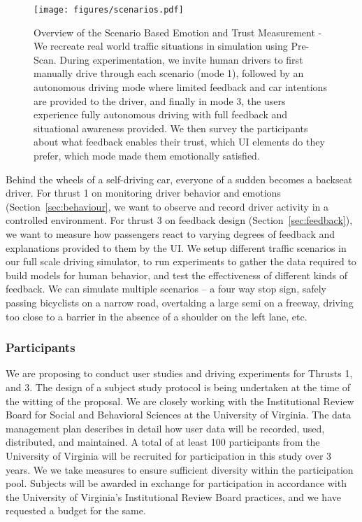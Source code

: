 \begin{figure}
    \centering
    \texttt{[image: figures/scenarios.pdf]}
    \caption{Overview of the Scenario Based Emotion and Trust Measurement - We recreate real world traffic situations in simulation using Pre-Scan. During experimentation, we invite human drivers to first manually drive through each scenario (mode 1), followed by an autonomous driving mode where limited feedback and car intentions are provided to the driver, and finally in mode 3, the users experience fully autonomous driving with full feedback and situational awareness provided. We then survey the participants about what feedback enables their trust, which UI elements do they prefer, which mode made them emotionally satisfied.  }
    \label{fig:scenario}
\end{figure}

Behind the wheels of a self-driving car, everyone of a sudden becomes a backseat driver. For thrust 1 on monitoring driver behavior and emotions (Section~\ref{sec:behaviour}, we want to observe and record driver activity in a controlled environment. 
For thrust 3 on feedback design (Section~\ref{sec:feedback}), we want to measure how passengers react to varying degrees of feedback and explanations provided to them by the UI. We setup different traffic scenarios in our full scale driving simulator, to run experiments to gather the data required to build models for human behavior, and test the effectiveness of different kinds of feedback. 
We can simulate multiple scenarios – a four way stop sign, safely passing bicyclists on a narrow road, overtaking a large semi on a freeway, driving too close to a barrier in the absence of a shoulder on the left lane, etc. 

\subsubsection{Participants}
We are proposing to conduct user studies and driving experiments for Thrusts 1, and 3.
The design of a subject study protocol is being undertaken at the time of the witting of the proposal. We are closely working with the Institutional Review Board for Social and Behavioral Sciences at the University of Virginia. The data management plan describes in detail how user data will be recorded, used, distributed, and maintained. A total of at least 100 participants from the University of Virginia will be recruited for participation in this study over 3 years. We we take measures to ensure sufficient diversity within the participation pool. Subjects will be awarded in exchange for participation in accordance with the University of Virginia’s Institutional Review Board practices, and we have requested a budget for the same.


